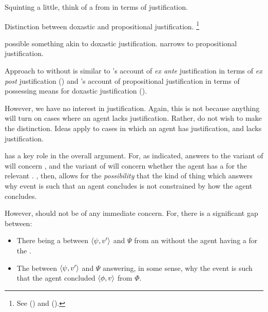 \begin{note}
  Squinting a little, think of a \ros{} from \supportI{} in terms of justification.

  Distinction between doxastic and propositional justification.%
  \footnote{
    See (\cite{Firth:1978vi}) and (\cite[esp.\ fn.1]{Silva:2020aa}).
  }

  \supportI{} possible something akin to doxastic justification.
  \supportII{} narrows to propositional justification.

  Approach to  without \wit{} is similar to \citeauthor{Goldman:1979ui}'s account of \emph{ex ante} justification in terms of \emph{ex post} justification (\citeyear[351--352]{Goldman:1979ui}) and \citeauthor{Turri:2010aa}'s account of propositional justification in terms of possessing means for doxastic justification (\citeyear[320]{Turri:2010aa}).

  However, we have no interest in justification.
  Again, this is not because anything will turn on cases where an agent lacks justification.
  Rather, do not wish to make the distinction.
  Ideas apply to cases in which an agent has justification, and lacks justification.
\end{note}






\begin{note}
  \supportII{} has a key role in the overall argument.
  For, as indicated, answers to the variant of \qWhy{} will concern \ros{}, and the variant of \qHow{} will concern whether the agent has a \wit{} for the relevant \ros{}.
  \supportII{}, then, allows for the \emph{possibility} that the kind of thing which answers why event is such that an agent concludes is not constrained by how the agent concludes.

  However, \supportII{} should not be of any immediate concern.
  For, there is a significant gap between:

  \begin{itemize}[noitemsep]
  \item
    There being a \ros{} between \(\langle \psi, v' \rangle\) and \(\Psi\) from an \agpe{} without the agent having a \wit{} for the \ros{}.
  \item
    The \ros{} between \(\langle \psi, v' \rangle\) and \(\Psi\)  answering, in some sense, why the event is such that the agent concluded \(\langle \phi, v \rangle\) from \(\Phi\).
  \end{itemize}
\end{note}




